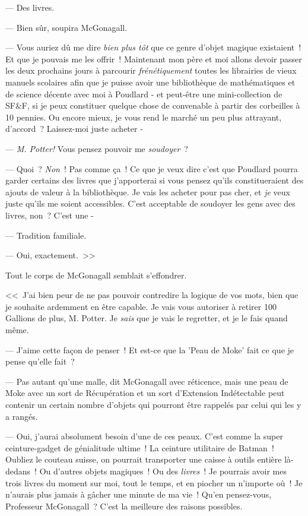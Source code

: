 --- Des livres.

--- Bien sûr, soupira McGonagall.

--- Vous auriez dû me dire \emph{bien plus tôt} que ce genre d'objet magique existaient~! Et que je pouvais me les offrir~! Maintenant mon père et moi allons devoir passer les deux prochains jours à parcourir \emph{frénétiquement} toutes les librairies de vieux manuels scolaires afin que je puisse avoir une bibliothèque de mathématiques et de science décente avec moi à Poudlard - et peut-être une mini-collection de SF\&F, si je peux constituer quelque chose de convenable à partir des corbeilles à 10 pennies. Ou encore mieux, je vous rend le marché un peu plus attrayant, d'accord~? Laissez-moi juste acheter -

--- \emph{M. Potter!} Vous pensez pouvoir me \emph{soudoyer}~?

--- Quoi~? \emph{Non}~! Pas comme ça~! Ce que je veux dire c'est que Poudlard pourra garder certains des livres que j'apporterai si vous pensez qu'ils constitueraient des ajouts de valeur à la bibliothèque. Je vais les acheter pour pas cher, et \emph{je} veux juste qu'ils me soient accessibles. C'est acceptable de soudoyer les gens avec des livres, non~? C'est une -

--- Tradition familiale.

--- Oui, exactement.~>>

Tout le corps de McGonagall semblait s'effondrer.

<<~J'ai bien peur de ne pas pouvoir contredire la logique de vos mots, bien que je souhaite ardemment en être capable. Je vais vous autoriser à retirer 100 Gallions de plus, M. Potter. Je \emph{sais} que je vais le regretter, et je le fais quand même.

--- J'aime cette façon de penser~! Et est-ce que la 'Peau de Moke' fait ce que je pense qu'elle fait~?

--- Pas autant qu'une malle, dit McGonagall avec réticence, mais une peau de Moke avec un sort de Récupération et un sort d'Extension Indétectable peut contenir un certain nombre d'objets qui pourront être rappelés par celui qui les y a rangés.

--- Oui, j'aurai absolument besoin d'une de ces peaux. C'est comme la super ceinture-gadget de génialitude ultime~! La ceinture utilitaire de Batman~! Oubliez le couteau suisse, on pourrait transporter une caisse à outils entière là-dedans~! Ou d'autres objets magiques~! Ou des \emph{livres}~! Je pourrais avoir mes trois livres du moment sur moi, tout le temps, et en piocher un n'importe où~! Je n'aurais plus jamais à gâcher une minute de ma vie~! Qu'en pensez-vous, Professeur McGonagall~? C'est la meilleure des raisons possibles.

